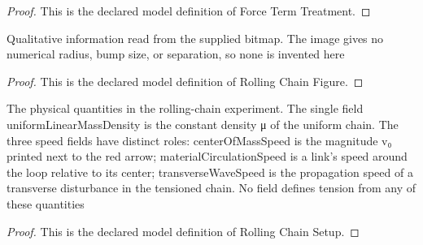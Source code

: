 \begin{proof}
  This is the declared model definition of Force Term Treatment.
\end{proof}
\begin{definition}
  \label{def:physics:phyx-mini-0244:phyxminiproblems-problemphyxmini0244-rollingchainfigure}
  Qualitative information read from the supplied bitmap. The image gives no numerical radius, bump size, or separation, so none is invented here
\end{definition}
\begin{proof}
  This is the declared model definition of Rolling Chain Figure.
\end{proof}
\begin{definition}
  \label{def:physics:phyx-mini-0244:phyxminiproblems-problemphyxmini0244-rollingchainsetup}
  The physical quantities in the rolling-chain experiment. The single field uniformLinearMassDensity is the constant density μ of the uniform chain. The three speed fields have distinct roles: centerOfMassSpeed is the magnitude v₀ printed next to the red arrow; materialCirculationSpeed is a link's speed around the loop relative to its center; transverseWaveSpeed is the propagation speed of a transverse disturbance in the tensioned chain. No field defines tension from any of these quantities
\end{definition}
\begin{proof}
  This is the declared model definition of Rolling Chain Setup.
\end{proof}
